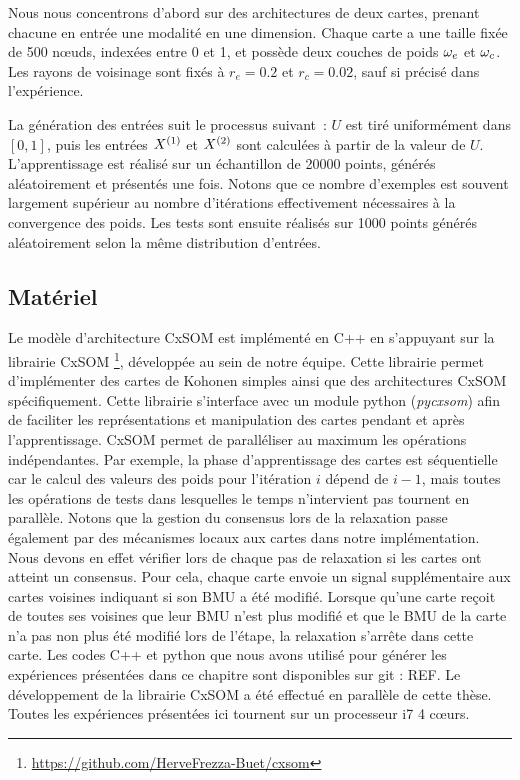 \documentclass[../main]{subfiles}
\begin{document}
Nous nous concentrons d'abord sur des architectures de deux cartes, prenant chacune en entrée une modalité en une dimension.
Chaque carte a une taille fixée de 500 n\oe{}uds, indexées entre 0 et 1, et possède deux couches de poids $\omega_e$ et $\omega_c$. Les rayons de voisinage sont fixés à $r_e = 0.2$ et $r_c = 0.02$, sauf si précisé dans l'expérience.

La génération des entrées suit le processus suivant~: $U$ est tiré uniformément dans $[0,1]$, puis les entrées $X^{({1})}$ et $X^{({2})}$ sont calculées à partir de la valeur de $U$. 
L'apprentissage est réalisé sur un échantillon de 20000 points, générés aléatoirement et présentés une fois. Notons que ce nombre d'exemples est souvent largement supérieur au nombre d'itérations effectivement nécessaires à la convergence des poids. 
Les tests sont ensuite réalisés sur 1000 points générés aléatoirement selon la même distribution d'entrées.

\subsection{Matériel}

Le modèle d'architecture CxSOM est implémenté en C++ en s'appuyant sur la librairie CxSOM \footnote{\url{https://github.com/HerveFrezza-Buet/cxsom}}, développée au sein de notre équipe.
Cette librairie permet d'implémenter des cartes de Kohonen simples ainsi que des architectures CxSOM spécifiquement.
Cette librairie s'interface avec un module python (\emph{pycxsom}) afin de faciliter les représentations et manipulation des cartes pendant et après l'apprentissage.
CxSOM permet de paralléliser au maximum les opérations indépendantes. Par exemple, la phase d'apprentissage des cartes est séquentielle car le calcul des valeurs des poids pour l'itération $i$ dépend de $i-1$, mais toutes les opérations de tests dans lesquelles le temps n'intervient pas tournent en parallèle.
Notons que la gestion du consensus lors de la relaxation passe également par des mécanismes locaux aux cartes dans notre implémentation. 
Nous devons en effet vérifier lors de chaque pas de relaxation si les cartes ont atteint un consensus. Pour cela, chaque carte envoie un signal supplémentaire aux cartes voisines indiquant si son BMU a été modifié. Lorsque qu'une carte reçoit de toutes ses voisines que leur BMU n'est plus modifié et que le BMU de la carte n'a pas non plus été modifié lors de l'étape, la relaxation s'arrête dans cette carte.
Les codes C++ et python que nous avons utilisé pour générer les expériences présentées dans ce chapitre sont disponibles sur git : REF.
Le développement de la librairie CxSOM a été effectué en parallèle de cette thèse. 
Toutes les expériences présentées ici tournent sur un processeur i7 4 c\oe{}urs.
\end{document}

